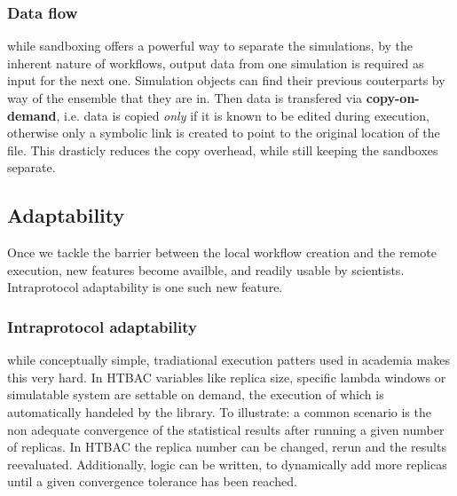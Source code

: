 \subsubsection{Data flow}

while sandboxing offers a powerful way to separate the simulations, by the
inherent nature of workflows, output data from one simulation is required as
input for the next one. Simulation objects can find their previous
couterparts by way of the ensemble that they are in. Then data is transfered
via \textbf{copy-on-demand}, i.e. data is copied \emph{only} if it is known
to be edited during execution, otherwise only a symbolic link is created to
point to the original location of the file. This drasticly reduces the copy
overhead, while still keeping the sandboxes separate.

\subsection{Adaptability}


Once we tackle the barrier between the local workflow creation and the remote
execution, new features become availble, and readily usable by scientists.
Intraprotocol adaptability is one such new feature.

\subsubsection{Intraprotocol adaptability}

while conceptually simple, tradiational execution patters used in academia
makes this very hard. In HTBAC variables like replica size, specific lambda
windows or simulatable system are settable on demand, the execution of which
is automatically handeled by the library. To illustrate: a common scenario is
the non adequate convergence of the statistical results after running a given
number of replicas. In HTBAC the replica number can be changed, rerun and the
results reevaluated. Additionally, logic can be written, to dynamically add
more replicas until a given convergence tolerance has been reached.
